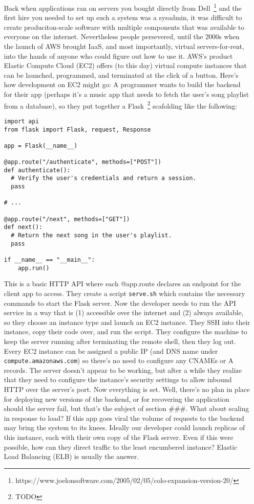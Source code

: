 \documentclass{article}
\newcommand{\newp}{\newline\indent}
\begin{document}
Back when applications ran on servers you bought directly from Dell~\footnote{https://www.joelonsoftware.com/2005/02/05/colo-expansion-version-20/} and the first hire you needed to set up such a system was a sysadmin, it was difficult to create produciton-scale software with multiple components that was available to everyone on the internet.
Nevertheless people persevered, until the 2000s when the launch of AWS brought IaaS, and most importantly, virtual servers-for-rent, into the hands of anyone who could figure out how to use it.
AWS's product Elastic Compute Cloud (EC2) offers (to this day) virtual compute instances that can be launched, programmed, and terminated at the click of a button.
Here's how development on EC2 might go:
\newp A programmer wants to build the backend for their app (perhaps it's a music app that needs to fetch the user's song playlist from a database), so they put together a Flask~\footnote{TODO} scafolding like the following:

\begin{verbatim}
import api
from flask import Flask, request, Response

app = Flask(__name__)

@app.route("/authenticate", methods=["POST"])
def authenticate():
  # Verify the user's credentials and return a session.
  pass

# ...

@app.route("/next", methods=["GET"])
def next():
  # Return the next song in the user's playlist.
  pass

if __name__ == "__main__":
    app.run()
\end{verbatim}

This is a basic HTTP API where each @app.route declares an endpoint for the client app to access.
They create a script \texttt{serve.sh} which contains the necessary commands to start the Flask server.
Now the developer needs to run the API service in a way that is (1) accessible over the internet and (2) always available, so they choose an instance type and launch an EC2 instance.
They SSH into their instance, copy their code over, and run the script.
They configure the machine to keep the server running after terminating the remote shell, then they log out.
Every EC2 instance can be assigned a public IP (and DNS name under \texttt{compute.amazonaws.com}) so there's no need to configure any CNAMEs or A records.
The server doesn't appear to be working, but after a while they realize that they need to configure the instance's security settings to allow inbound HTTP over the server's port.
Now everything is set.
\newp Well, there's no plan in place for deploying new versions of the backend, or for recovering the application should the server fail, but that's the subject of section \#\#\#.
\newp What about scaling in response to load?
If this app goes viral the volume of requests to the backend may bring the system to its knees.
Ideally our developer could launch replicas of this instance, each with their own copy of the Flask server.
Even if this were possible, how can they direct traffic to the least encumbered instance?
Elastic Load Balancing (ELB) is usually the answer.
\end{document}
